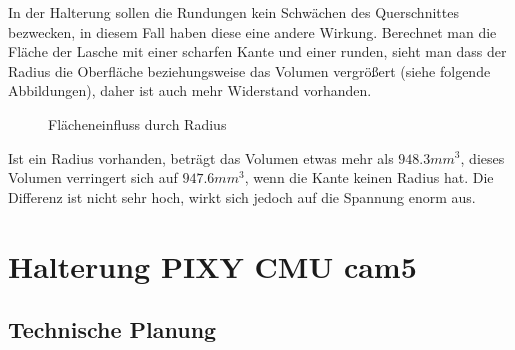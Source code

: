 	In der Halterung sollen die Rundungen kein Schwächen des Querschnittes bezwecken, in diesem Fall haben diese eine andere Wirkung.
	Berechnet man die Fläche der Lasche mit einer scharfen Kante und einer runden,
	sieht man dass der Radius die Oberfläche beziehungsweise das Volumen vergrößert (siehe folgende Abbildungen), daher ist auch mehr Widerstand vorhanden.

			\begin{figure}[H]
				\begin{centering}
				\caption{Flächeneinfluss durch Radius}
				\par\end{centering}
				\label{klammer_radius}
			\end{figure}

	Ist ein Radius vorhanden, beträgt das Volumen etwas mehr als $948.3 mm^{3}$, dieses Volumen verringert sich auf $947.6 mm^{3}$, wenn die Kante keinen Radius hat. Die Differenz ist nicht sehr hoch, wirkt sich jedoch auf die Spannung enorm aus.

			\newpage

\section{Halterung PIXY CMU cam5}

	\subsection{Technische Planung}

